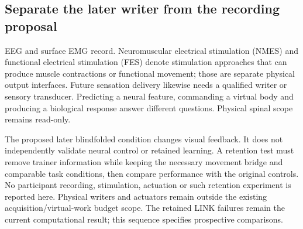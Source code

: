 \subsection{Separate the later writer from the recording proposal}

EEG and surface EMG record. Neuromuscular electrical stimulation (NMES) and functional electrical stimulation (FES) denote stimulation approaches that can
produce muscle contractions or functional movement; those are separate physical
output interfaces. Future sensation delivery likewise needs a qualified writer
or sensory transducer. Predicting a neural feature, commanding a virtual body
and producing a biological response answer different questions. Physical spinal
scope remains read-only.

The proposed later blindfolded condition changes visual feedback. It does not
independently validate neural control or retained learning. A retention test must
remove trainer information while keeping the necessary movement bridge and
comparable task conditions, then compare performance with the original controls.
No participant recording, stimulation, actuation or such retention experiment is
reported here. Physical writers and actuators remain outside the existing
acquisition/virtual-work budget scope. The retained LINK failures remain the
current computational result; this sequence specifies prospective comparisons.
